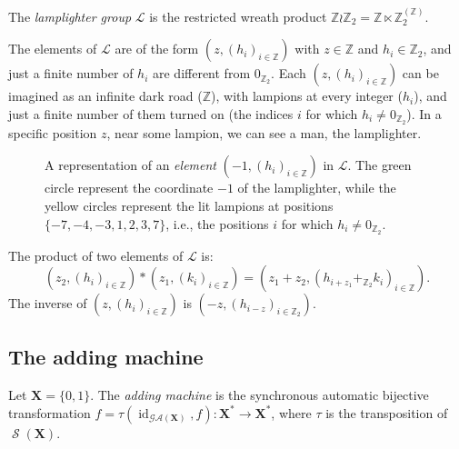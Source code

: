 \documentclass[mat1]{fmfdeloTS2.0}
\newcommand{\Z}{\mathbb Z}
\newcommand{\obs}{}				%
\newcommand{\abece}{\mathbf{X}}			%
\newcommand{\fslovar}{\mathbf{X^*}}		%
\newcommand{\synaut}{\mathcal{GA}}	%
\newcommand{\LL}{\mathcal{L}}		%
\DeclareMathOperator{\symm}{\mathcal{S}}		%
\DeclareMathOperator{\id}{\mathrm{id}}			%
\begin{document}
\begin{definition}
The \emph{lamplighter group} $\LL$ is the \obs{restricted} wreath product \mbox{$\Z\wr\Z_2=\Z\ltimes\Z_{2}^{(\Z)}$}. 
\end{definition}

The elements of $\LL$ are of the form $(z, (h_{i})_{i\in\Z})$ with $z\in\Z$ and $h_i\in\Z_2$, and just a finite number of $h_i$ are different from $0_{\Z_2}$. Each $(z, (h_{i})_{i\in\Z})$ can be imagined as an infinite dark road ($\Z$), with lampions at every integer ($h_i$), and just a finite number of them turned on (the indices $i$ for which $h_i\neq0_{\Z_2}$). In a specific position $z$, near some lampion, we can see a man, the lamplighter.

\begin{figure}[H]
\begin{center}
\end{center}
\caption{A representation of an \emph{element} $(-1, (h_i)_{i\in\Z})$ in $\LL$. The green circle represent the coordinate $-1$ of the lamplighter, while the yellow circles represent the lit lampions at positions $\{-7,-4,-3,1,2,3,7\}$, i.e., the positions $i$ for which $h_i\neq0_{\Z_2}$.} 
\end{figure}

The product of two elements of $\LL$ is:
$$(z_2, (h_i)_{i\in\Z})*(z_1, (k_i)_{i\in\Z})=(z_1+z_2, (h_{i+z_1} +_{\Z_2} k_i)_{i\in\Z}).$$
The inverse of $(z, (h_{i})_{i\in\Z})$ is $(-z, (h_{i-z})_{i\in\Z_2})$.

\subsection{The adding machine}

\begin{definition}
Let $\abece=\{0,1\}$. The \emph{adding machine} is the synchronous automatic bijective transformation $f=\tau(\id_{\synaut(\abece)},f):\fslovar\longrightarrow\fslovar$, where $\tau$ is the transposition of $\symm(\abece)$.
\end{definition}
\end{document}
